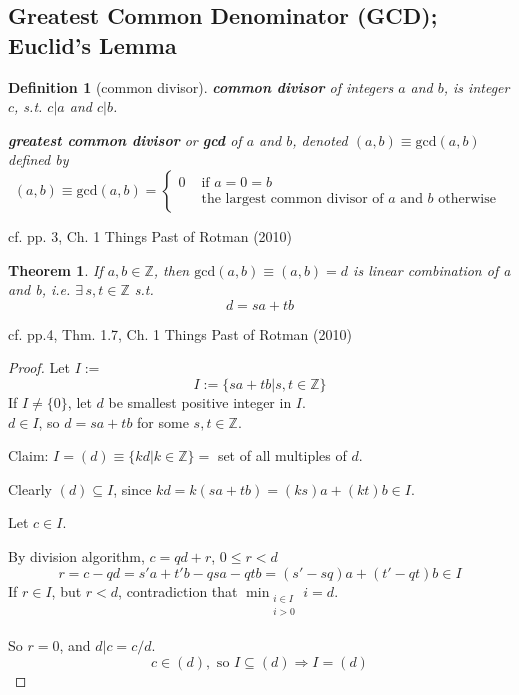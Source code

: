 \documentclass[10pt]{amsart}
\newtheorem{theorem}{Theorem}
\newtheorem{definition}{Definition}
\begin{document}
\begin{multicols*}{2}
\subsection{Greatest Common Denominator (GCD); Euclid's Lemma}

\begin{definition}[common divisor]
	\textbf{common divisor} of integers $a$ and $b$, is integer $c$, s.t. $ c | a$ \emph{and} $c|b$.  

\textbf{greatest common divisor} or \textbf{gcd} of $a$ and $b$, denoted $(a,b) \equiv \text{gcd}(a,b)$ defined by 
\[
(a,b) \equiv \text{gcd}(a,b) = \begin{cases} 0 & \text{ if } a = 0 = b \\ 
& \text{ the largest common divisor of $a$ and $b$ otherwise } \end{cases}  
\]
	\end{definition} 
cf. pp. 3, Ch. 1 Things Past of Rotman (2010) \cite{JRotman2010}  


\begin{theorem}\label{Thm:lincombgcd}
	If $a,b\in \mathbb{Z}$, then $\text{gcd}(a,b) \equiv (a,b)=d$ is linear combination of a and b, i.e. $\exists \, s,t \in \mathbb{Z}$ s.t.
\begin{equation}
d= sa + tb
\end{equation}
\end{theorem}
cf. pp.4, Thm. 1.7, Ch. 1 Things Past of Rotman (2010) \cite{JRotman2010}

\begin{proof}
Let $I:=$ 
\[
I :=\lbrace sa+tb|s,t\in \mathbb{Z} \rbrace
\]
If $I\neq \lbrace 0 \rbrace$, let $d$ be smallest positive integer in $I$.   \\
$d\in I$, so $d=sa + tb$ for some $s,t\in \mathbb{Z}$.  

Claim: $I=(d) \equiv \lbrace kd| k\in \mathbb{Z} \rbrace = $ set of all multiples of $d$.  

Clearly $(d)\subseteq I$, since $kd=k(sa+tb) = (ks)a+(kt)b\in I$.  

Let $c\in I$.  

By division algorithm, $c=qd + r$, $0\leq r <d$
\[
r=c-qd = s'a+t'b - qsa - qtb = (s'-sq)a + (t'-qt)b \in I
\]
If $r\in I$, but $r<d$, contradiction that $\min_{ \substack{ i \in I \\ i>0 \\ } } i =d$.  

So $r=0$, and $d|c=c/d$.  
\[
c \in (d), \text{ so } I\subseteq (d) \Longrightarrow I =(d)
\]
\end{proof}



\end{multicols*}
\end{document}
